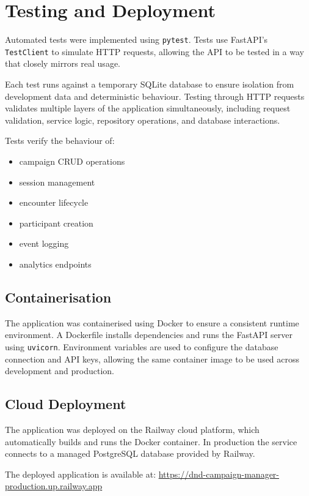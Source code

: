 \documentclass[11pt]{article}
\begin{document}
\section{Testing and Deployment}

Automated tests were implemented using \texttt{pytest}. Tests use
FastAPI's \texttt{TestClient} to simulate HTTP requests, allowing the
API to be tested in a way that closely mirrors real usage.

Each test runs against a temporary SQLite database to ensure isolation
from development data and deterministic behaviour. Testing through HTTP
requests validates multiple layers of the application simultaneously,
including request validation, service logic, repository operations, and
database interactions.

Tests verify the behaviour of:

\begin{itemize}
\item campaign CRUD operations
\item session management
\item encounter lifecycle
\item participant creation
\item event logging
\item analytics endpoints
\end{itemize}

\subsection{Containerisation}

The application was containerised using Docker to ensure a consistent
runtime environment. A Dockerfile installs dependencies and runs the
FastAPI server using \texttt{uvicorn}. Environment variables are used
to configure the database connection and API keys, allowing the same
container image to be used across development and production.

\subsection{Cloud Deployment}

The application was deployed on the Railway cloud platform, which
automatically builds and runs the Docker container. In production the
service connects to a managed PostgreSQL database provided by Railway.

The deployed application is available at:
\url{https://dnd-campaign-manager-production.up.railway.app}
\end{document}
